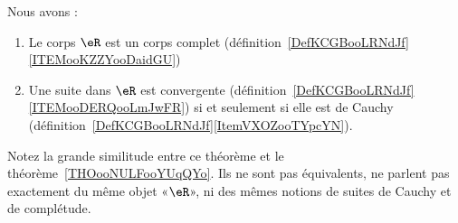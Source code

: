 \begin{theorem} \label{THOooUFVJooYJlieh}
    Nous avons :
    \begin{enumerate}
        \item
            Le corps \( \eR\) est un corps complet (définition~\ref{DefKCGBooLRNdJf}\ref{ITEMooKZZYooDaidGU})
        \item
            Une suite dans \( \eR\) est convergente (définition~\ref{DefKCGBooLRNdJf}\ref{ITEMooDERQooLmJwFR}) si et seulement si elle est de Cauchy (définition~\ref{DefKCGBooLRNdJf}\ref{ItemVXOZooTYpcYN}).
    \end{enumerate}
\end{theorem}
Notez la grande similitude entre ce théorème et le théorème~\ref{THOooNULFooYUqQYo}. Ils ne sont pas équivalents, ne parlent pas exactement du même objet «\( \eR\)», ni des mêmes notions de suites de Cauchy et de complétude.

